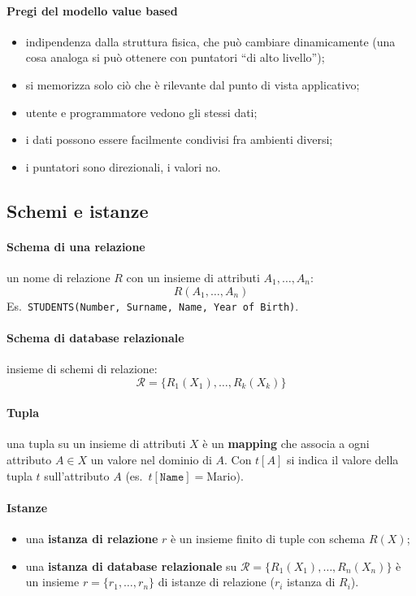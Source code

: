 \documentclass[a4paper,12pt]{article}
\begin{document}
\paragraph{Pregi del modello value based}
\begin{itemize}
  \item indipendenza dalla struttura fisica, che può cambiare dinamicamente
    (una cosa analoga si può ottenere con puntatori ``di alto livello'');
  \item si memorizza solo ciò che è rilevante dal punto di vista applicativo;
  \item utente e programmatore vedono gli stessi dati;
  \item i dati possono essere facilmente condivisi fra ambienti diversi;
  \item i puntatori sono direzionali, i valori no.
\end{itemize}

\subsection{Schemi e istanze}

\paragraph{Schema di una relazione} un nome di relazione $R$ con un insieme di
attributi $A_1, \ldots, A_n$:
\[
  R(A_1, \ldots, A_n)
\]
Es.\ \texttt{STUDENTS(Number, Surname, Name, Year of Birth)}.

\paragraph{Schema di database relazionale} insieme di schemi di relazione:
\[
  \mathcal{R} = \{R_1(X_1), \ldots, R_k(X_k)\}
\]

\paragraph{Tupla} una tupla su un insieme di attributi $X$ è un
\textbf{mapping} che associa a ogni attributo $A \in X$ un valore nel dominio
di $A$. Con $t[A]$ si indica il valore della tupla $t$ sull'attributo $A$
(es.\ $t[\texttt{Name}] = \text{Mario}$).

\paragraph{Istanze}
\begin{itemize}
  \item una \textbf{istanza di relazione} $r$ è un insieme finito di tuple con
    schema $R(X)$;
  \item una \textbf{istanza di database relazionale} su
    $\mathcal{R} = \{R_1(X_1), \ldots, R_n(X_n)\}$ è un insieme
    $r = \{r_1, \ldots, r_n\}$ di istanze di relazione ($r_i$ istanza di $R_i$).
\end{itemize}
\end{document}
